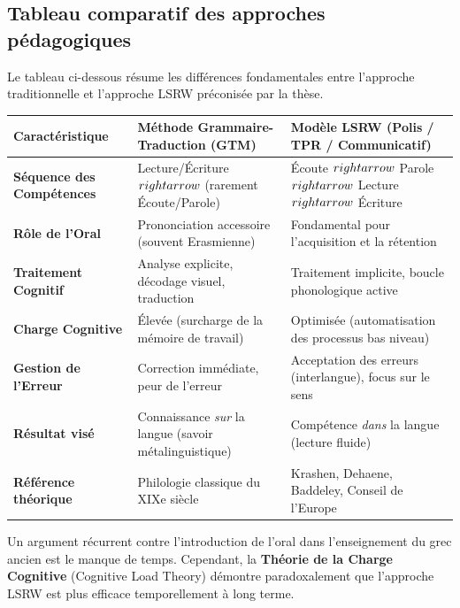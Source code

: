 \subsection{Tableau comparatif des approches pédagogiques}

Le tableau ci-dessous résume les différences fondamentales entre l'approche traditionnelle et
l'approche LSRW préconisée par la thèse.

\begin{table}[h!]\small\centering\begin{tabular}{| p{2.3cm} | p{3.5cm} | p{3.5cm} |}\hline\textbf{Caractéristique} & \textbf{Méthode Grammaire-Traduction (GTM)} & \textbf{Modèle LSRW (Polis / TPR / Communicatif)} \\ \hline\textbf{Séquence des Compétences} & Lecture/Écriture $\\rightarrow$ (rarement Écoute/Parole) & Écoute $\\rightarrow$ Parole $\\rightarrow$ Lecture $\\rightarrow$ Écriture \\ \hline\textbf{Rôle de l'Oral} & Prononciation accessoire (souvent Erasmienne) & Fondamental pour l'acquisition et la rétention \\ \hline\textbf{Traitement Cognitif} & Analyse explicite, décodage visuel, traduction & Traitement implicite, boucle phonologique active \\ \hline\textbf{Charge Cognitive} & Élevée (surcharge de la mémoire de travail) & Optimisée (automatisation des processus bas niveau) \\ \hline\textbf{Gestion de l'Erreur} & Correction immédiate, peur de l'erreur & Acceptation des erreurs (interlangue), focus sur le sens \\ \hline\textbf{Résultat visé} & Connaissance \textit{sur} la langue (savoir métalinguistique) & Compétence \textit{dans} la langue (lecture fluide) \\ \hline\textbf{Référence théorique} & Philologie classique du XIXe siècle & Krashen, Dehaene, Baddeley, Conseil de l'Europe \\ \hline\end{tabular}\end{table}Un argument récurrent contre l'introduction de l'oral dans l'enseignement du grec ancien est le
manque de temps. Cependant, la \textbf{Théorie de la Charge Cognitive} (Cognitive Load Theory)
démontre paradoxalement que l'approche LSRW est plus efficace temporellement à long terme.



